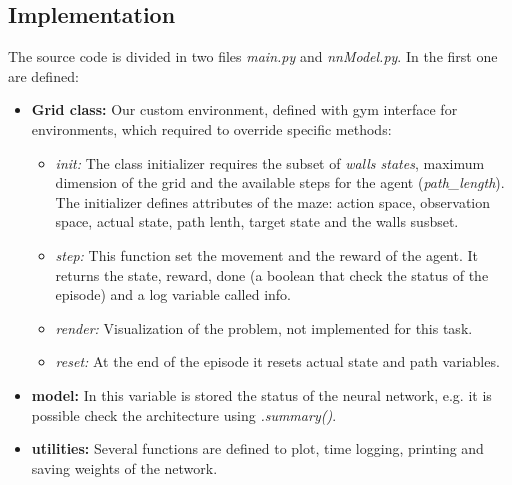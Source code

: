 \subsection{Implementation}
The source code is divided in two files \textit{main.py} and \textit{nnModel.py}.
In the first one are defined:
\begin{itemize}
    \item \textbf{Grid class: }Our custom environment, defined with gym interface for environments, which required to override specific methods: 
    \begin{itemize}
        \item \textit{init: }The class initializer requires the subset of \textit{walls states}, maximum dimension of the grid and the available steps for the agent (\textit{path\_length}). 
        The initializer defines attributes of the maze: action space, observation space, actual state, path lenth, target state and the walls susbset.
        \item \textit{step: }This function set the movement and the reward of the agent. It returns the state, reward, done (a boolean that check the status of the episode) and a log variable called info.
        \item \textit{render: }Visualization of the problem, not implemented for this task.
        \item \textit{reset: }At the end of the episode it resets actual state and path variables.
        \end{itemize}
    \item \textbf{model: }In this variable is stored the status of the neural network, e.g. it is possible check the architecture using\textit{ .summary()}. 
    \item \textbf{utilities: }Several functions are defined to plot, time logging, printing and saving weights of the network.

\end{itemize}

